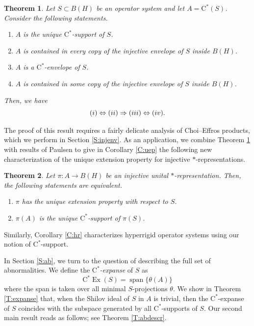 \documentclass[10pt]{amsart}
\newcommand{\rC}{\mathrm{C}}
\newcommand{\Ab}{\operatorname{Ab}}
\newcommand{\Exp}{\operatorname{Ex}}
\newcommand{\spn}{\operatorname{span}}
\newtheorem{theoremx}{Theorem}
\theoremstyle{definition}
\begin{document}
\begin{theoremx}\label{T:A}
Let $S\subset B(H)$  be an operator system and let $A=\rC^*(S)$. Consider the following statements.
\begin{enumerate}[{\rm (i)}]
\item $A$ is the unique $\rC^*$-support of $S$.
\item $A$ is contained  in every copy of the injective envelope of $S$ inside $B(H)$.
\item $A$ is a $\rC^*$-envelope of $S$.
\item $A$ is contained in some copy of the injective envelope of $S$ inside $B(H)$.
\end{enumerate}
Then, we have 
\[
{\rm (i)}\Leftrightarrow{\rm (ii)}\Rightarrow{\rm (iii)}\Leftrightarrow{\rm (iv)}.
\]
\end{theoremx}
The proof of this result requires a fairly delicate analysis of Choi--Effros products, which we perform in Section \ref{S:injenv}. As an application, we combine Theorem \ref{T:A} with results of Paulsen \cite{paulsen2011} to give  in Corollary  \ref{C:uep} the following new characterization of the unique extension property for injective $*$-representations.

\begin{theoremx}\label{T:C}
Let $\pi:A\to B(H)$ be an injective unital $*$-representation.  Then, the following statements are equivalent.
\begin{enumerate}[{\rm (i)}]
\item $\pi$ has the unique extension property with respect to $S$. 
\item $\pi(A)$ is the unique $\rC^*$-support of $\pi(S)$.
\end{enumerate}
\end{theoremx}

Similarly, Corollary \ref{C:hr} characterizes  hyperrigid operator systems using our notion of $\rC^*$-support. 

In Section \ref{S:ab}, we turn to the question of describing the full set of abnormalities. 
We define the \emph{$\rC^*$-expanse} of $S$ as
\[
\rC^*\Exp(S)=\spn\{\theta(A) \}
\] 
where  the span is taken over all  minimal $S$-projections $\theta$. We show in Theorem \ref{T:expanse} that, when the Shilov ideal of $S$ in $A$ is trivial, then the $\rC^*$-expanse of $S$ coincides with the subspace generated by all $\rC^*$-supports of $S$. 
Our second main result reads as follows; see Theorem \ref{T:abdescr}.
\end{document}
